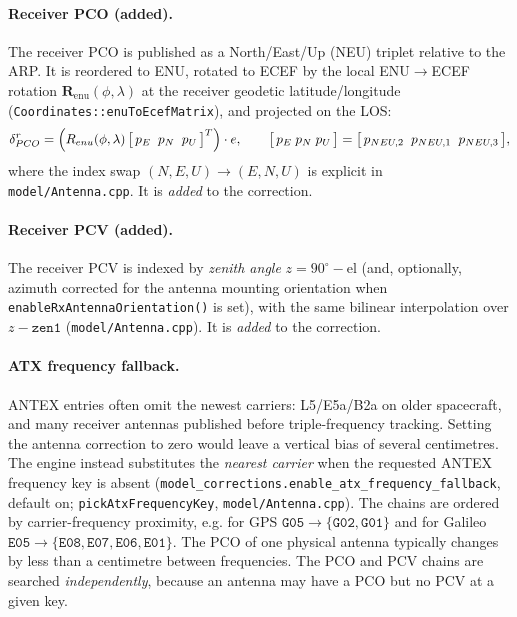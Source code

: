 \documentclass[main.tex]{subfiles}
\begin{document}
\paragraph{Receiver PCO (added).}
The receiver PCO is published as a North/East/Up (NEU) triplet relative to
the ARP.  It is reordered to ENU, rotated to ECEF by the local
ENU$\to$ECEF rotation $\bm{R}_{\mathrm{enu}}(\phi,\lambda)$ at the
receiver geodetic latitude/longitude
(\texttt{Coordinates::enuToEcefMatrix}), and projected on the LOS:
\begin{equation}
\delta_{PCO}^{r}
=
\Big(R_{enu}(\phi,\lambda)\,
\big[\,p_E\;\;p_N\;\;p_U\,\big]^{T}\Big)\cdot e,
\qquad
\big[\,p_E\;p_N\;p_U\,\big] = \big[\,p_{NEU,2}\;\;
p_{NEU,1}\;\;p_{NEU,3}\,\big],
\label{eq:obsphys-rx-pco}
\end{equation}
where the index swap $(N,E,U)\!\to\!(E,N,U)$ is explicit in
\texttt{model/Antenna.cpp}.  It is \emph{added} to the correction.

\paragraph{Receiver PCV (added).}
The receiver PCV is indexed by \emph{zenith angle} $z = 90^\circ -
\mathrm{el}$ (and, optionally, azimuth corrected for the antenna mounting
orientation when \texttt{enableRxAntennaOrientation()} is set), with the
same bilinear interpolation over $z-\mathtt{zen1}$
(\texttt{model/Antenna.cpp}).  It is \emph{added} to the correction.

\paragraph{ATX frequency fallback.}
ANTEX entries often omit the newest carriers: L5/E5a/B2a on older
spacecraft, and many receiver antennas published before triple-frequency
tracking.  Setting the antenna correction to zero would leave a vertical
bias of several centimetres.  The engine instead substitutes the
\emph{nearest carrier} when the requested ANTEX frequency key is absent
(\texttt{model\_corrections.enable\_atx\_frequency\_fallback}, default on;
\texttt{pickAtxFrequencyKey}, \texttt{model/Antenna.cpp}).  The chains are ordered by carrier-frequency
proximity, e.g. for GPS $\mathtt{G05}\to\{\mathtt{G02},\mathtt{G01}\}$ and
for Galileo $\mathtt{E05}\to\{\mathtt{E08},\mathtt{E07},\mathtt{E06},
\mathtt{E01}\}$.  The PCO of one physical antenna typically changes by
less than a centimetre between frequencies.  The PCO and PCV chains are
searched \emph{independently}, because an antenna may have a PCO but no
PCV at a given key.
\end{document}
